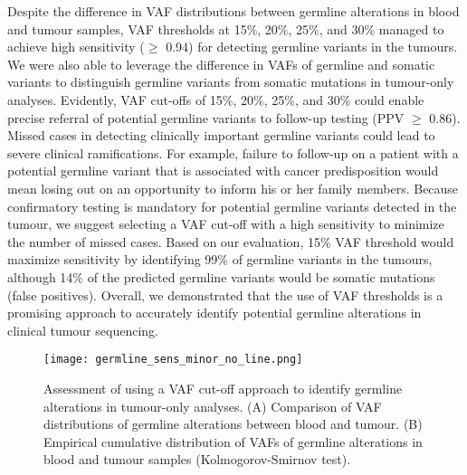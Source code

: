Despite the difference in VAF distributions between germline alterations in blood and tumour samples, VAF thresholds at 15\%, 20\%, 25\%, and 30\% managed to achieve high sensitivity ($\geq$ 0.94) for detecting germline variants in the tumours. We were also able to leverage the difference in VAFs of germline and somatic variants to distinguish germline variants from somatic mutations in tumour-only analyses. Evidently, VAF cut-offs of 15\%, 20\%, 25\%, and 30\% could enable precise referral of potential germline variants to follow-up testing (PPV $\geq$ 0.86). Missed cases in detecting clinically important germline variants could lead to severe clinical ramifications. For example, failure to follow-up on a patient with a potential germline variant that is associated with cancer predisposition would mean losing out on an opportunity to inform his or her family members. Because confirmatory testing is mandatory for potential germline variants detected in the tumour, we suggest selecting a VAF cut-off with a high sensitivity to minimize the number of missed cases. Based on our evaluation, 15\% VAF threshold would maximize sensitivity by identifying 99\% of germline variants in the tumours, although 14\% of the predicted germline variants would be somatic mutations (false positives). Overall, we demonstrated that the use of VAF thresholds is a promising approach to accurately identify potential germline alterations in clinical tumour sequencing.


\begin{figure}[H]
	\texttt{[image: germline\_sens\_minor\_no\_line.png]}
	\caption[Assessment of using a VAF cut-off approach to identify germline alterations in tumour-only analyses.]{Assessment of using a VAF cut-off approach to identify germline alterations in tumour-only analyses. (A) Comparison of VAF distributions of germline alterations between blood and tumour. (B) Empirical cumulative distribution of VAFs of germline alterations in blood and tumour samples (Kolmogorov-Smirnov test).}
	\label{fig:germline_sens_minor}
\end{figure}



